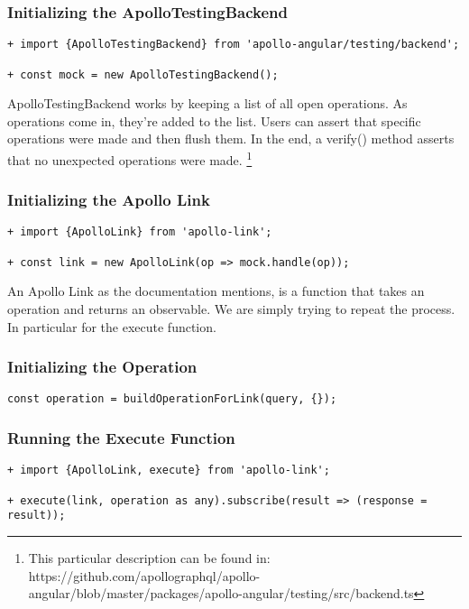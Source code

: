 \subsubsection { Initializing the ApolloTestingBackend }
\begin{lstlisting}
+ import {ApolloTestingBackend} from 'apollo-angular/testing/backend';

+ const mock = new ApolloTestingBackend();
\end{lstlisting}

ApolloTestingBackend works by keeping a list of all open operations.
As operations come in, they're added to the list. Users can assert that specific
operations were made and then flush them. In the end, a verify() method asserts
that no unexpected operations were made.
\footnote{This particular description can be found in: https://github.com/apollographql/apollo-angular/blob/master/packages/apollo-angular/testing/src/backend.ts}

\subsubsection { Initializing the Apollo Link }

\begin{lstlisting}
+ import {ApolloLink} from 'apollo-link';

+ const link = new ApolloLink(op => mock.handle(op));
\end{lstlisting}

An Apollo Link as the documentation mentions, is a function that takes an
operation and returns an observable. We are simply trying to repeat the process.
In particular for the execute function.

\subsubsection { Initializing the Operation }
\begin{lstlisting}
const operation = buildOperationForLink(query, {});
\end{lstlisting}

\subsubsection { Running the Execute Function }
\begin{lstlisting}
+ import {ApolloLink, execute} from 'apollo-link';

+ execute(link, operation as any).subscribe(result => (response = result));
\end{lstlisting}
